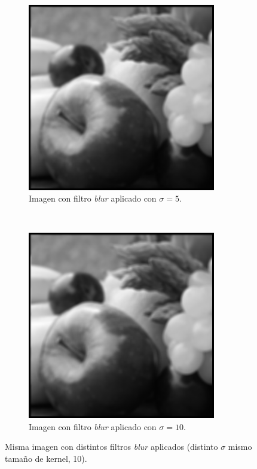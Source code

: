 \begin{figure}[H]
\begin{subfigure}[t]{0.32\textwidth}
      \includegraphics[width = 0.9\textwidth]{frutas_std5.png}
      \caption{Imagen con filtro \textit{blur} aplicado con $\sigma=5$.}
  \end{subfigure}
  ~ 
  \begin{subfigure}[t]{0.32\textwidth}
      \centering
      \includegraphics[width = 0.9\textwidth]{frutas_std10.png}
      \caption{Imagen con filtro \textit{blur} aplicado con $\sigma=10$.}
  \end{subfigure}
  \caption{Misma imagen con distintos filtros \textit{blur} aplicados (distinto $\sigma$ mismo tamaño de kernel, 10). }
  \label{fig:frutas}
\end{figure}


